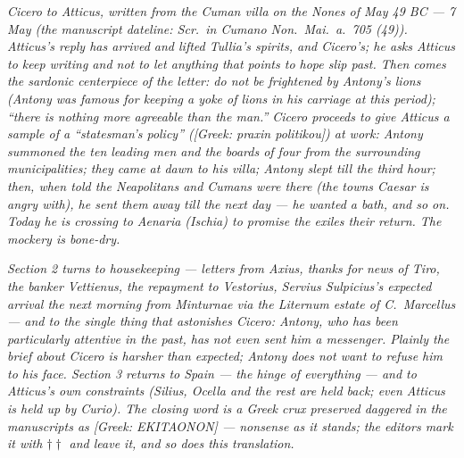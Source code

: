 
\textit{Cicero to Atticus, written from the Cuman villa
on the Nones of May 49 BC --- 7 May (the manuscript
dateline: \textit{Scr.\ in Cumano Non.\ Mai.\ a.\ 705
(49)}). Atticus's reply has arrived and lifted Tullia's
spirits, and Cicero's; he asks Atticus to keep writing
and not to let anything that points to hope slip past.
Then comes the sardonic centerpiece of the letter: do
not be frightened by Antony's lions (Antony was famous
for keeping a yoke of lions in his carriage at this
period); ``there is nothing more agreeable than the
man.'' Cicero proceeds to give Atticus a sample of a
``statesman's policy''
(\textit{[Greek: praxin politikou]}) at work: Antony
summoned the ten leading men and the boards of four
from the surrounding municipalities; they came at dawn
to his villa; Antony slept till the third hour; then,
when told the Neapolitans and Cumans were there (the
towns Caesar is angry with), he sent them away till the
next day --- he wanted a bath, and so on. Today he is
crossing to Aenaria (Ischia) to promise the exiles their
return. The mockery is bone-dry.}

\textit{Section 2 turns to housekeeping --- letters from
Axius, thanks for news of Tiro, the banker Vettienus,
the repayment to Vestorius, Servius Sulpicius's
expected arrival the next morning from Minturnae via
the Liternum estate of C.~Marcellus --- and to the
single thing that astonishes Cicero: Antony, who has
been particularly attentive in the past, has not even
sent him a messenger. Plainly the brief about Cicero is
harsher than expected; Antony does not want to refuse
him to his face. Section 3 returns to Spain --- the
hinge of everything --- and to Atticus's own
constraints (Silius, Ocella and the rest are held back;
even Atticus is held up by Curio). The closing word is
a Greek crux preserved daggered in the manuscripts as
\textit{[Greek: EKITAONON]} --- nonsense as it stands;
the editors mark it with $\dagger\dagger$ and leave it,
and so does this translation.}
